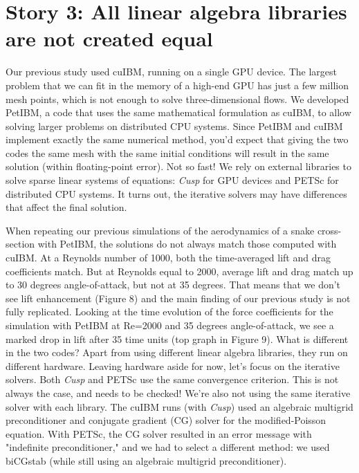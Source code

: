 \documentclass[9pt,twocolumn,twoside]{article}
\newlength{\up}
\begin{document}
\section*{Story 3: All linear algebra libraries are not created equal}

Our previous study used cuIBM, running on a single GPU device. 
The largest problem that we can fit in the memory of a high-end GPU has just a few million mesh points, which is not enough to solve three-dimensional flows. 
We developed PetIBM, a code that uses the same mathematical formulation as cuIBM, to allow solving larger problems on distributed CPU systems. 
Since PetIBM and cuIBM implement exactly the same numerical method, you'd expect that giving the two codes the same mesh with the same initial conditions will result in the same solution (within floating-point error). 
Not so fast! 
We rely on external libraries to solve sparse linear systems of equations: \textsl{Cusp} for GPU devices and PETSc for distributed CPU systems. 
It turns out, the iterative solvers may have differences that affect the final solution.

When repeating our previous simulations of the aerodynamics of a snake cross-section with PetIBM, the solutions do not always match those computed with cuIBM. 
At a Reynolds number of 1000, both the time-averaged lift and drag coefficients match. 
But at Reynolds equal to 2000, average lift and drag match up to 30 degrees angle-of-attack, but not at 35 degrees. 
That means that we don't see lift enhancement (Figure 8) and the main finding of our previous study is not fully replicated. 
Looking at the time evolution of the force coefficients for the simulation with PetIBM at Re=2000 and 35 degrees angle-of-attack, we see a marked drop in lift after 35 time units (top graph in Figure 9). 
What is different in the two codes? 
Apart from using different linear algebra libraries, they run on different hardware. 
Leaving hardware aside for now, let's focus on the iterative solvers. 
Both \textsl{Cusp} and PETSc use the same convergence criterion. 
This is not always the case, and needs to be checked! 
We're also not using the same iterative solver with each library. 
The cuIBM runs (with \textsl{Cusp}) used an algebraic multigrid preconditioner and conjugate gradient (CG) solver for the modified-Poisson equation. 
With PETSc, the CG solver resulted in an error message with "indefinite preconditioner," and we had to select a different method: we used biCGstab (while still using an algebraic multigrid preconditioner). 
\end{document}
